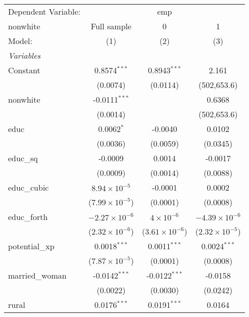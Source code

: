 
\begingroup
\centering
\begin{tabular}{lccc}
   \tabularnewline \midrule \midrule
   Dependent Variable: & \multicolumn{3}{c}{emp}\\
   nonwhite        & Full sample             & 0                       & 1 \\   
   Model:          & (1)                     & (2)                     & (3)\\  
   \midrule
   \emph{Variables}\\
   Constant        & 0.8574$^{***}$          & 0.8943$^{***}$          & 2.161\\   
                   & (0.0074)                & (0.0114)                & (502,653.6)\\   
   nonwhite        & -0.0111$^{***}$         &                         & 0.6368\\   
                   & (0.0014)                &                         & (502,653.6)\\   
   educ            & 0.0062$^{*}$            & -0.0040                 & 0.0102\\   
                   & (0.0036)                & (0.0059)                & (0.0345)\\   
   educ\_sq        & -0.0009                 & 0.0014                  & -0.0017\\   
                   & (0.0009)                & (0.0014)                & (0.0088)\\   
   educ\_cubic     & $8.94\times 10^{-5}$    & -0.0001                 & 0.0002\\   
                   & ($7.99\times 10^{-5}$)  & (0.0001)                & (0.0008)\\   
   educ\_forth     & $-2.27\times 10^{-6}$   & $4\times 10^{-6}$       & $-4.39\times 10^{-6}$\\    
                   & ($2.32\times 10^{-6}$)  & ($3.61\times 10^{-6}$)  & ($2.32\times 10^{-5}$)\\    
   potential\_xp   & 0.0018$^{***}$          & 0.0011$^{***}$          & 0.0024$^{***}$\\   
                   & ($7.87\times 10^{-5}$)  & (0.0001)                & (0.0008)\\   
   married\_woman  & -0.0142$^{***}$         & -0.0122$^{***}$         & -0.0158\\   
                   & (0.0022)                & (0.0030)                & (0.0242)\\   
   rural           & 0.0176$^{***}$          & 0.0191$^{***}$          & 0.0164\\   

\end{tabular}
